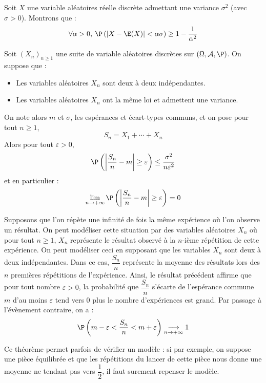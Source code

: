 \documentclass[a4paper,10pt]{report}
\begin{document}
\begin{ex} Soit $X$ une variable aléatoires réelle discrète admettant une variance $\sigma^{2}$ (avec $\sigma > 0$). Montrons que :
  \[
  \forall \alpha > 0,\:\P\left(\vert X - \E(X) \vert < \alpha \sigma \right) \geq 1 - \frac{1}{\alpha^{2}}
  \]
  
 \vspace{5cm}
\end{ex}

\begin{thm} Soit $(X_n)_{n \geq 1}$ une suite de variable aléatoires discrètes sur $(\Omega, \mathcal{A}, \P)$. On suppose que :
\begin{itemize}
\item Les variables aléatoires $X_n$ sont deux à deux indépendantes.
\item Les variables aléatoires $X_n$ ont la même loi et admettent une variance.
\end{itemize}
On note alors $m$ et $\sigma$, les espérances et écart-types communs, et on pose pour tout $n \geq 1$,
$$ S_n = X_1 + \cdots + X_n$$
Alors pour tout $\varepsilon>0$,
$$ \P \left( \left\vert \dfrac{S_n}{n}-m \right\vert  \geq \varepsilon \right) \leq \dfrac{\sigma^2}{n \varepsilon^2}$$
et en particulier :
$$ \lim_{n \rightarrow + \infty} \P \left( \left\vert \dfrac{S_n}{n}-m \right\vert  \geq \varepsilon \right) = 0$$
\end{thm}

\begin{preuve}

\vspace{8cm}
\end{preuve}

\newpage

\phantom{test}

\vspace{6cm}
\begin{rems} 
\item Supposons que l'on répète une infinité de fois la même expérience où l'on observe un résultat. On peut modéliser cette situation par des variables aléatoires $X_n$ où pour tout $n \geq 1$, $X_n$ représente le résultat observé à la $n$-ième répétition de cette expérience. On peut modéliser ceci en supposant que les variables $X_n$ sont deux à deux indépendantes. Dans ce cas, $\dfrac{S_n}{n}$ représente la moyenne des résultats lors des $n$ premières répétitions de l'expérience. Ainsi, le résultat précédent affirme que pour tout nombre $\varepsilon>0$, la probabilité que $\dfrac{S_n}{n}$ s'écarte de l'espérance commune $m$ d'au moins $\varepsilon$ tend vers $0$ plus le nombre d'expériences est grand. Par passage à l'évènement contraire, on a :
$$ \P \left( m - \varepsilon < \dfrac{S_n}{n}< m + \varepsilon \right) \underset{n \rightarrow + \infty}{\longrightarrow} 1$$
\item Ce théorème permet parfois de vérifier un modèle : si par exemple, on suppose une pièce équilibrée et que les répétitions du lancer de cette pièce nous donne une moyenne ne tendant pas vers $\dfrac{1}{2}$, il faut surement repenser le modèle.
\end{rems}
\end{document}
